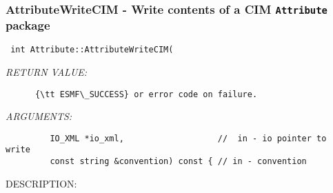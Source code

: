  
\setlength{\oldparskip}{\parskip}
\setlength{\parskip}{1.5ex}
\setlength{\oldparindent}{\parindent}
\setlength{\parindent}{0pt}
\setlength{\oldbaselineskip}{\baselineskip}
\setlength{\baselineskip}{11pt}
 
\def\bv{\begin{verbatim}}
\def\ev{\end{verbatim}}
\def\be{\begin{equation}}
\def\ee{\end{equation}}
\def\bea{\begin{eqnarray}}
\def\eea{\end{eqnarray}}
\def\bi{\begin{itemize}}
\def\ei{\end{itemize}}
\def\bn{\begin{enumerate}}
\def\en{\end{enumerate}}
\def\bd{\begin{description}}
\def\ed{\end{description}}
\def\({\left (}
\def\){\right )}
\def\[{\left [}
\def\]{\right ]}
\def\<{\left  \langle}
\def\>{\right \rangle}
\def\cI{{\cal I}}
\def\diag{\mathop{\rm diag}}
\def\tr{\mathop{\rm tr}}


 

  
 
\mbox{}\hrulefill\
 
\subsubsection [AttributeWriteCIM] {AttributeWriteCIM - Write contents of a CIM {\tt Attribute} package}


  
\begin{verbatim} int Attribute::AttributeWriteCIM(\end{verbatim}{\em RETURN VALUE:}
\begin{verbatim}      {\tt ESMF\_SUCCESS} or error code on failure.\end{verbatim}{\em ARGUMENTS:}
\begin{verbatim}         IO_XML *io_xml,                   //  in - io pointer to write
         const string &convention) const { // in - convention\end{verbatim}
{\sf DESCRIPTION:\\ }


